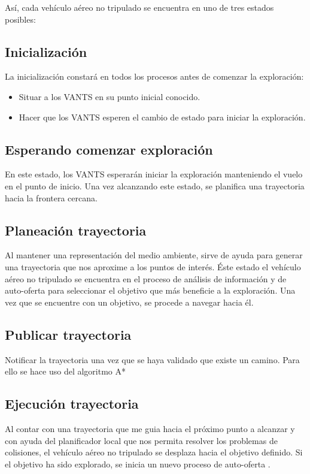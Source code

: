 Así, cada vehículo aéreo no tripulado se encuentra en uno de tres estados posibles:

\subsection*{Inicialización}

La inicialización constará en todos los procesos antes de comenzar la exploración:
\begin{itemize}\setlength{\itemsep}{-1mm}
\item Situar a los VANTS en su punto inicial conocido.
\item Hacer que los VANTS esperen el cambio de estado para iniciar la exploración.
\end{itemize}

\subsection*{Esperando comenzar exploración}

En este estado, los VANTS esperarán iniciar la exploración manteniendo el vuelo en el punto de inicio.
Una vez alcanzando este estado, se planifica una trayectoria hacia la frontera cercana.
\subsection*{Planeación trayectoria}

Al mantener una representación del medio ambiente, sirve de ayuda para generar una trayectoria que nos aproxime a los puntos de interés. Éste estado el vehículo aéreo no tripulado se encuentra en el proceso de análisis de información y de auto-oferta para seleccionar el objetivo que más beneficie a la exploración. Una vez que se encuentre con un objetivo, se procede a navegar hacia él. 

\subsection*{Publicar trayectoria}

Notificar la trayectoria una vez que se haya validado que existe un camino. Para ello se hace uso del algoritmo A* 

\subsection*{Ejecución trayectoria}

Al contar con una trayectoria que me guia hacia el próximo punto a alcanzar y con ayuda del planificador local que nos permita resolver los problemas de colisiones, el vehículo aéreo no tripulado se desplaza hacia el objetivo definido. Si el objetivo ha sido explorado, se inicia un nuevo proceso de auto-oferta \cite{CINVESTAM2013}.


